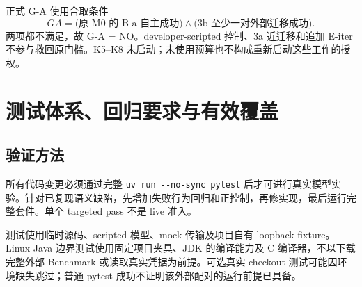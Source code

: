 \documentclass[UTF8,a4paper,zihao=-4,fontset=none]{ctexart}
\newcommand{\code}[1]{{\small\nolinkurl{#1}}}
\begin{document}
正式 G-A 使用合取条件
\begin{equation}
G\!A=\bigl(\text{原 M0 的 B-a 自主成功}\bigr)
\land\bigl(\text{3b 至少一对外部迁移成功}\bigr).
\end{equation}
两项都不满足，故 G-A = NO。developer-scripted 控制、3a 近迁移和追加 E-iter 不参与救回原门槛。K5--K8 未启动；未使用预算也不构成重新启动这些工作的授权。\cite{gate}

\section{测试体系、回归要求与有效覆盖}
\subsection{验证方法}
所有代码变更必须通过完整 \code{uv run --no-sync pytest} 后才可进行真实模型实验。针对已复现语义缺陷，先增加失败行为回归和正控制，再修实现，最后运行完整套件。单个 targeted pass 不是 live 准入。

测试使用临时源码、scripted 模型、mock 传输及项目自有 loopback fixture。Linux Java 边界测试使用固定项目夹具、JDK 的编译能力及 C 编译器，不以下载完整外部 Benchmark 或读取真实凭据为前提。可选真实 checkout 测试可能因环境缺失跳过；普通 pytest 成功不证明该外部配对的运行前提已具备。
\end{document}
